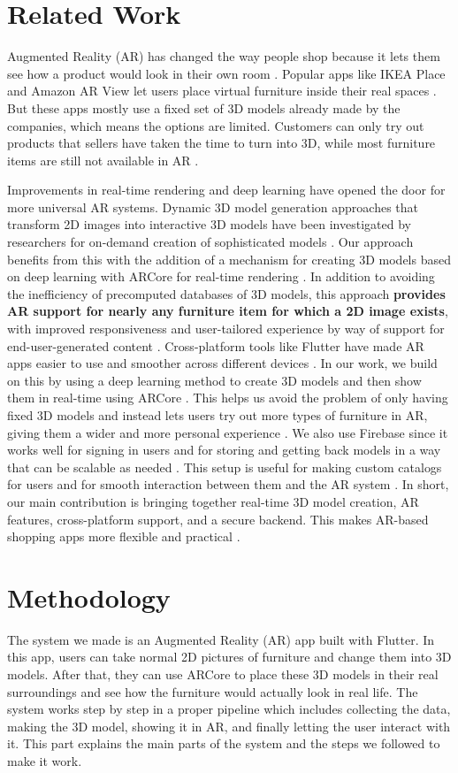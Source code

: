 \documentclass[12pt, a4paper]{article}
\begin{document}
\section{Related Work}
Augmented Reality (AR) has changed the way people shop because it lets them see how a product would look in their own room \cite{ref1}. Popular apps like IKEA Place and Amazon AR View let users place virtual furniture inside their real spaces \cite{ref7}. But these apps mostly use a fixed set of 3D models already made by the companies, which means the options are limited. Customers can only try out products that sellers have taken the time to turn into 3D, while most furniture items are still not available in AR \cite{ref14}.

Improvements in real-time rendering and deep learning have opened the door for more universal AR systems. Dynamic 3D model generation approaches that transform 2D images into interactive 3D models have been investigated by researchers for on-demand creation of sophisticated models \cite{ref12}. Our approach benefits from this with the addition of a mechanism for creating 3D models based on deep learning with ARCore for real-time rendering \cite{ref2}. In addition to avoiding the inefficiency of precomputed databases of 3D models, this approach \textbf{provides AR support for nearly any furniture item for which a 2D image exists}, with improved responsiveness and user-tailored experience by way of support for end-user-generated content \cite{ref5}. Cross-platform tools like Flutter have made AR apps easier to use and smoother across different devices \cite{ref9}. In our work, we build on this by using a deep learning method to create 3D models and then show them in real-time using ARCore \cite{ref2}. This helps us avoid the problem of only having fixed 3D models and instead lets users try out more types of furniture in AR, giving them a wider and more personal experience \cite{ref5}. We also use Firebase since it works well for signing in users and for storing and getting back models in a way that can be scalable as needed \cite{ref4,ref10}. This setup is useful for making custom catalogs for users and for smooth interaction between them and the AR system \cite{ref20}. In short, our main contribution is bringing together real-time 3D model creation, AR features, cross-platform support, and a secure backend. This makes AR-based shopping apps more flexible and practical \cite{ref17}.

\section{Methodology}
The system we made is an Augmented Reality (AR) app built with Flutter. In this app, users can take normal 2D pictures of furniture and change them into 3D models. After that, they can use ARCore \cite{ref2} to place these 3D models in their real surroundings and see how the furniture would actually look in real life. The system works step by step in a proper pipeline which includes collecting the data, making the 3D model, showing it in AR, and finally letting the user interact with it. This part explains the main parts of the system and the steps we followed to make it work.
\end{document}
